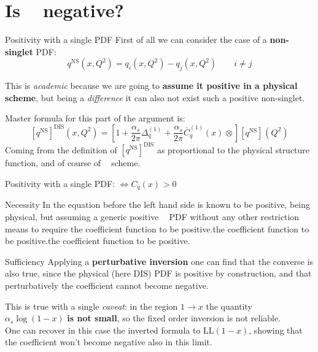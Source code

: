 \documentclass[9pt]{beamer}
\DeclareMathOperator{\msbar}{\overline{MS}}
\begin{document}
\section{Is $\msbar$ negative?}
\begin{frame}{Positivity with a single PDF}
    First of all we can consider the case of a \textbf{non-singlet} PDF:
    \begin{equation*}
        q^{\text{NS}}(x, Q^2) = q_i(x, Q^2) - q_j(x, Q^2) \qquad i \neq j
    \end{equation*}
    
    This is \textit{academic} because we are going to \textbf{assume it
    positive in a physical scheme}, but being a \textit{difference} it can also
    not exist such a positive non-singlet.

    \vspace*{15pt}
    Master formula for this part of the argument is:
    \begin{equation*}
        \left[{q^{\text{NS}}}\right]^{\text{DIS}}(x,Q^2)=
        \left[1+\frac{\alpha_s}{2\pi} {\Delta^{(1)}_q}^{\msbar}
        +\frac{\alpha_s}{2\pi}  {\bar
        C^{(1)}_q(x)}^{\msbar}\otimes\right]\left[{q^{\text{NS}}}\right]^{\msbar}(Q^2)
    \end{equation*}
    Coming from the definition of $\left[{q^{\text{NS}}}\right]^{\text{DIS}}$
    as proportional to the physical structure function, and of course of
    $\msbar$ scheme.
\end{frame}

\begin{frame}{Positivity with a single PDF: $\iff C_q(x)^{\msbar} > 0$}
    \begin{block}{Necessity}
        In the equation before the left hand side is known to be positive,
        being physical, but assuming a generic positive $\msbar$ PDF without
        any other restriction means to require the coefficient function to be
        positive.the coefficient function to be positive.the coefficient
        function to be positive.
    \end{block}
    \begin{block}{Sufficiency}
        Applying a \textbf{perturbative inversion} one can find that the
        converse is also true, since the physical (here $\text{DIS}$) PDF is
        positive by construction, and that perturbatively the coefficient
        cannot become negative.

        This is true with a single \textit{caveat}: in the region $1 \to x$ the
        quantity $\alpha_s\log(1-x)$ \textbf{is not small}, so the fixed order
        inversion is not reliable.\\
        One can recover in this case the inverted formula to $\text{LL}(1-x)$,
        showing that the coefficient won't become negative also in this limit.
    \end{block}
\end{frame}
\end{document}
